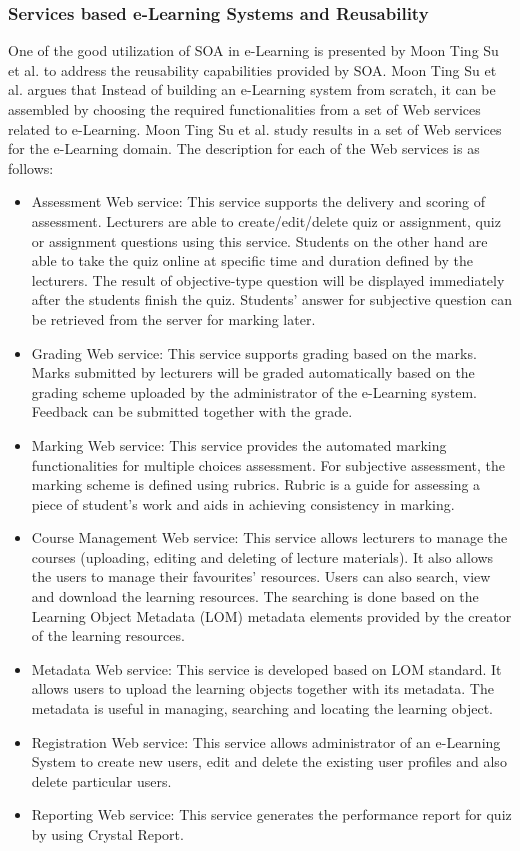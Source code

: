 \documentclass[12pt,a4paper,final,twoside,onecolumn,titlepage]{book}
\begin{document}
\subsubsection{Services based e-Learning Systems and Reusability}
One of the good utilization of \gls{SOA} in e-Learning is presented by Moon Ting Su et al. \cite{R60} to address the reusability capabilities provided by \gls{SOA}. Moon Ting Su et al. argues that Instead of building an e-Learning system from scratch, it can be assembled by choosing the required functionalities from a set of Web services related to e-Learning. Moon Ting Su et al. study results in a set of Web services for the e-Learning domain. The description for each of the Web services is as follows:
\begin{itemize}
\item Assessment Web service: This service supports the delivery and scoring of assessment. Lecturers are able to create/edit/delete quiz or assignment, quiz or assignment questions using this service. Students on the other hand are able to take the quiz online at specific time and duration defined by the lecturers. The result of objective-type question will be displayed immediately after the students finish the quiz. Students’ answer for subjective question can be retrieved from the server for marking later.
\item Grading Web service: This service supports grading based on the marks. Marks submitted by lecturers will be graded automatically based on the grading scheme uploaded by the administrator of the e-Learning system. Feedback can be submitted together with the grade.
\item Marking Web service: This service provides the automated marking functionalities for multiple choices assessment. For subjective assessment, the marking scheme is defined using rubrics. Rubric is a guide for assessing a piece of student’s work and aids in achieving consistency in marking.
\item Course Management Web service: This service allows lecturers to manage the courses (uploading, editing and deleting of lecture materials). It also allows the users to manage their favourites’ resources. Users can also search, view and download the learning resources. The searching is done based on the Learning Object Metadata (LOM) metadata elements provided by the creator of the learning resources.
\item Metadata Web service: This service is developed based on LOM standard. It allows users to upload the learning objects together with its metadata. The metadata is useful in managing, searching and locating the learning object.
\item Registration Web service: This service allows administrator of an e-Learning System to create new users, edit and delete the existing user profiles and also delete particular users.
\item Reporting Web service: This service generates the performance report for quiz by using Crystal Report.
\end{itemize}
\end{document}
